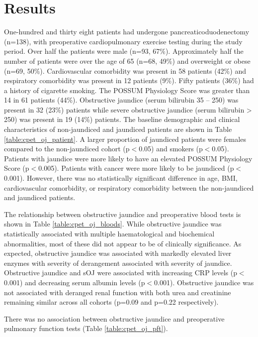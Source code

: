 \section{Results}
One-hundred and thirty eight patients had undergone pancreaticoduodenectomy (n=138), with preoperative cardiopulmonary exercise testing during the study period. Over half the patients were male (n=93, 67\%). Approximately half the number of patients were over the age of 65 (n=68, 49\%) and overweight or obese (n=69, 50\%). Cardiovascular comorbidity was present in 58 patients (42\%) and respiratory comorbidity was present in 12 patients (9\%). Fifty patients (36\%) had a history of cigarette smoking. The POSSUM Physiology Score was greater than 14 in 61 patients (44\%). Obstructive jaundice (serum bilirubin 35 – 250) was present in 32 (23\%) patients while severe obstructive jaundice (serum bilirubin > 250) was present in 19 (14\%) patients. 
The baseline demographic and clinical characteristics of non-jaundiced and jaundiced patients are shown in Table \ref{table:cpet_oj_patient}. A larger proportion of jaundiced patients were females compared to the non-jaundiced cohort (p$<$0.05) and smokers (p$<$0.05). Patients with jaundice were more likely to have an elevated POSSUM Physiology Score (p$<$0.005). Patients with cancer were more likely to be jaundiced (p$<$0.001). However, there was no statistically significant difference in age, BMI, cardiovascular comorbidity, or respiratory comorbidity between the non-jaundiced and jaundiced patients.



The relationship between obstructive jaundice and preoperative blood tests is shown in Table \ref{table:cpet_oj_bloods}. While obstructive jaundice was statistically associated with multiple haematological and biochemical abnormalities, most of these did not appear to be of clinically significance. As expected, obstructive jaundice was associated with markedly elevated liver enzymes with severity of derangement associated with severity of jaundice. Obstructive jaundice and sOJ were associated with increasing CRP levels (p$<$0.001) and decreasing serum albumin levels (p$<$0.001). Obstructive jaundice was not associated with deranged renal function with both urea and creatinine remaining similar across all cohorts (p=0.09 and p=0.22 respectively).



There was no association between obstructive jaundice and preoperative pulmonary function tests (Table \ref{table:cpet_oj_pft}).

